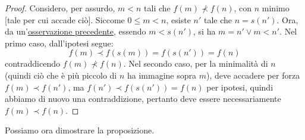 \documentclass[11pt]{scrartcl}
\begin{document}
\begin{proof}
	Considero, per assurdo, $m < n$ tali che $f(m) \not \prec f(n)$, con $n$ minimo [tale per cui accade ciò]. Siccome $0 \leq m < n$, esiste $n'$ tale che $n = s(n')$.
	Ora, da un'\hyperref[succ2]{osservazione precedente}, essendo $m < s(n')$, si ha $m = n' \lor m < n'$. Nel primo caso, dall'ipotesi segue:
	\[ f(m) \prec f(s(m)) = f(s(n')) = f(n)
		\]
	contraddicendo $f(m) \not\prec f(n)$. Nel secondo caso, per la minimalità di $n$ (quindi ciò che è più piccolo di $n$ ha immagine sopra $m$), deve accadere per forza $f(m) \prec f(n')$, ma $f(n') \prec f(s(n')) = f(n)$ per ipotesi, quindi abbiamo di nuovo una contraddizione,
	pertanto deve essere necessariamente $f(m) \prec f(n)$.
\end{proof}

Possiamo ora dimostrare la proposizione.
\end{document}
